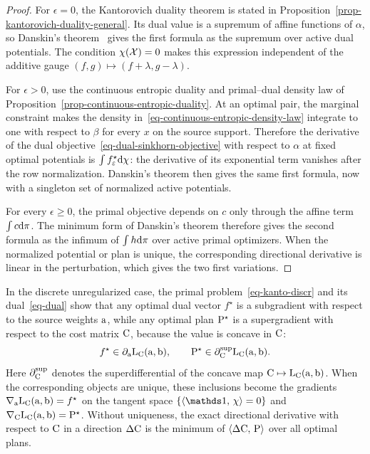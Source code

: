 \begin{proof}
	For $\epsilon=0$, the Kantorovich duality theorem is stated in Proposition~\ref{prop-kantorovich-duality-general}. Its dual value is a supremum of affine functions of $\alpha$, so Danskin's theorem~\cite{Danskin1967} gives the first formula as the supremum over active dual potentials. The condition $\chi(\Xx)=0$ makes this expression independent of the additive gauge $(f,g)\mapsto(f+\lambda,g-\lambda)$.

	For $\epsilon>0$, use the continuous entropic duality and primal--dual density law of Proposition~\ref{prop-continuous-entropic-duality}. At an optimal pair, the marginal constraint makes the density in~\eqref{eq-continuous-entropic-density-law} integrate to one with respect to $\beta$ for every $x$ on the source support. Therefore the derivative of the dual objective~\eqref{eq-dual-sinkhorn-objective} with respect to $\alpha$ at fixed optimal potentials is $\int f_\epsilon^\star\d\chi$: the derivative of its exponential term vanishes after the row normalization. Danskin's theorem then gives the same first formula, now with a singleton set of normalized active potentials.

	For every $\epsilon\geq0$, the primal objective depends on $c$ only through the affine term $\int c\d\pi$. The minimum form of Danskin's theorem therefore gives the second formula as the infimum of $\int h\d\pi$ over active primal optimizers. When the normalized potential or plan is unique, the corresponding directional derivative is linear in the perturbation, which gives the two first variations.
\end{proof}

In the discrete unregularized case, the primal problem~\eqref{eq-kanto-discr} and its dual~\eqref{eq-dual} show that any optimal dual vector $f^\star$ is a subgradient with respect to the source weights $\a$, while any optimal plan $\P^\star$ is a supergradient with respect to the cost matrix $\C$, because the value is concave in $\C$:
\[
	f^\star\in\partial_{\a}\MKD_{\C}(\a,\b),
	\qquad
	\P^\star\in\partial_{\C}^{\mathrm{sup}}\MKD_{\C}(\a,\b).
\]
Here $\partial_{\C}^{\mathrm{sup}}$ denotes the superdifferential of the concave map $\C\mapsto\MKD_{\C}(\a,\b)$. When the corresponding objects are unique, these inclusions become the gradients $\nabla_{\a}\MKD_{\C}(\a,\b)=f^\star$ on the tangent space $\{\dotp{\ones}{\chi}=0\}$ and $\nabla_{\C}\MKD_{\C}(\a,\b)=\P^\star$. Without uniqueness, the exact directional derivative with respect to $\C$ in a direction $\Delta\C$ is the minimum of $\dotp{\Delta\C}{\P}$ over all optimal plans.

